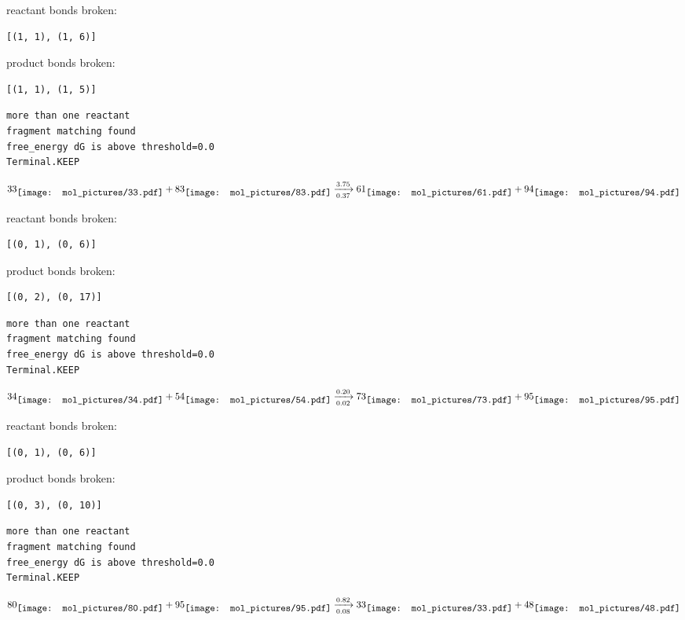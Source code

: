 \documentclass{article}
\begin{document}
reactant bonds broken:\begin{verbatim}
[(1, 1), (1, 6)]
\end{verbatim}
product bonds broken:\begin{verbatim}
[(1, 1), (1, 5)]
\end{verbatim}




\vspace{1cm}
\begin{verbatim}
more than one reactant
fragment matching found
free_energy dG is above threshold=0.0
Terminal.KEEP
\end{verbatim}
$$
33
\raisebox{-.5\height}{\texttt{[image: mol\_pictures/33.pdf]}}
+
83
\raisebox{-.5\height}{\texttt{[image: mol\_pictures/83.pdf]}}
\xrightarrow[0.37]{3.75}
61
\raisebox{-.5\height}{\texttt{[image: mol\_pictures/61.pdf]}}
+
94
\raisebox{-.5\height}{\texttt{[image: mol\_pictures/94.pdf]}}
$$


reactant bonds broken:\begin{verbatim}
[(0, 1), (0, 6)]
\end{verbatim}
product bonds broken:\begin{verbatim}
[(0, 2), (0, 17)]
\end{verbatim}




\vspace{1cm}
\begin{verbatim}
more than one reactant
fragment matching found
free_energy dG is above threshold=0.0
Terminal.KEEP
\end{verbatim}
$$
34
\raisebox{-.5\height}{\texttt{[image: mol\_pictures/34.pdf]}}
+
54
\raisebox{-.5\height}{\texttt{[image: mol\_pictures/54.pdf]}}
\xrightarrow[0.02]{0.20}
73
\raisebox{-.5\height}{\texttt{[image: mol\_pictures/73.pdf]}}
+
95
\raisebox{-.5\height}{\texttt{[image: mol\_pictures/95.pdf]}}
$$


reactant bonds broken:\begin{verbatim}
[(0, 1), (0, 6)]
\end{verbatim}
product bonds broken:\begin{verbatim}
[(0, 3), (0, 10)]
\end{verbatim}




\vspace{1cm}
\begin{verbatim}
more than one reactant
fragment matching found
free_energy dG is above threshold=0.0
Terminal.KEEP
\end{verbatim}
$$
80
\raisebox{-.5\height}{\texttt{[image: mol\_pictures/80.pdf]}}
+
95
\raisebox{-.5\height}{\texttt{[image: mol\_pictures/95.pdf]}}
\xrightarrow[0.08]{0.82}
33
\raisebox{-.5\height}{\texttt{[image: mol\_pictures/33.pdf]}}
+
48
\raisebox{-.5\height}{\texttt{[image: mol\_pictures/48.pdf]}}
$$
\end{document}
